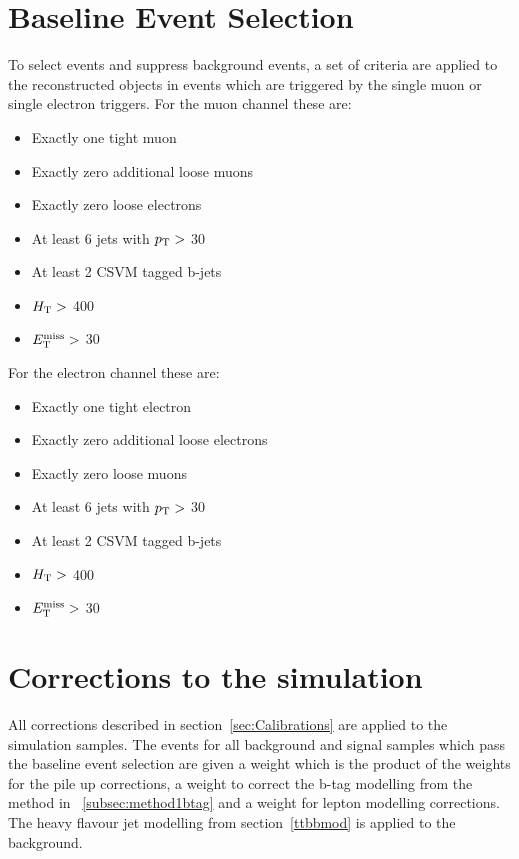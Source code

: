 \section{Baseline Event Selection}
\label{sec:baseline}
To select \tttt events and suppress background events, a set of criteria are applied to the reconstructed objects in events which are triggered by the single muon or single electron triggers.
For the muon channel these are:
\begin{itemize}
\setlength\itemsep{0em} 
\item Exactly one tight muon
\item Exactly zero additional loose muons
\item Exactly zero loose electrons
\item At least 6 jets with $p_{\mathrm{T}} >$ 30 \GeV
\item At least 2 CSVM tagged b-jets
\item $H_{\mathrm{T}} > $ 400 \GeV 
\item $E_{\mathrm{T}}^{\text{miss}} > $ 30 \GeV 
\end{itemize}
For the electron channel these are:
\begin{itemize}
\itemsep0em 
\item Exactly one tight electron
\item Exactly zero additional loose electrons
\item Exactly zero loose muons
\item At least 6 jets with $p_{\mathrm{T}} >$ 30 \GeV
\item At least 2 CSVM tagged b-jets
\item $H_{\mathrm{T}} > $ 400 \GeV 
\item $E_{\mathrm{T}}^{\text{miss}} > $ 30 \GeV 
\end{itemize}

\section{Corrections to the simulation}
\label{sec:Calibrations8}
All corrections described in section~\ref{sec:Calibrations} are applied to the simulation samples.
The events for all background and signal samples which pass the baseline event selection are given a weight which is the product of the weights for the pile up corrections, a weight to correct the b-tag modelling from the method in ~\ref{subsec:method1btag} and a weight for lepton modelling corrections. The heavy flavour jet modelling from section~\ref{ttbbmod} is applied to the \ttbar background.




